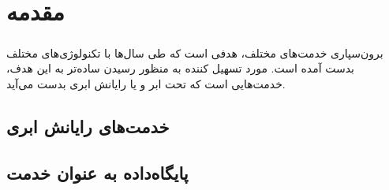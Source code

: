 
\chapter{مقدمه} \label{chapter:introduction}

\paragraph*{}
برون‌سپاری
خدمت‌های مختلف، هدفی است که طی سال‌ها با تکنولوژی‌های مختلف بدست آمده است. مورد تسهیل کننده به منظور رسیدن ساده‌تر به این هدف، خدمت‌هایی است که تحت ابر
و یا رایانش ابری
بدست می‌آید.
\cite{rountree-2013}


\section{خدمت‌های رایانش ابری}

\section{پایگاه‌داده به عنوان خدمت}